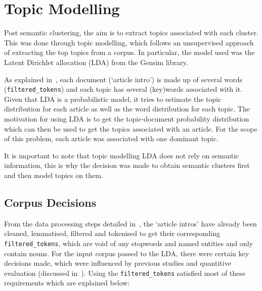 \section{Topic Modelling}

Post semantic clustering, the aim is to extract topics associated with each cluster. This was done through topic modelling, which follows an unsupervised approach of extracting the top topics from a corpus. In particular, the model used was the Latent Dirichlet allocation (LDA) from the Gensim library. 

As explained in~, each document (`article intro') is made up of several words (\texttt{filtered\_tokens}) and each topic has several (key)words associated with it. Given that LDA is a probabilistic model, it tries to estimate the topic distribution for each article as well as the word distribution for each topic. The motivation for using LDA is to get the topic-document probability distribution which can then be used to get the topics associated with an article. For the scope of this problem, each article was associated with one dominant topic. 

It is important to note that topic modelling LDA does not rely on semantic information, this is why the decision was made to obtain semantic clusters first and then model topics on them.
\vspace{-1ex}
\subsection{Corpus Decisions}

From the data processing steps detailed in~, the `article intros' have already been cleaned, lemmatised, filtered and tokenised to get their corresponding \texttt{filtered\_tokens}, which are void of any stopwords and named entities and only contain nouns. For the input corpus passed to the LDA, there were certain key decisions made, which were influenced by previous studies and quantitive evaluation (discussed in~). Using the \texttt{filtered\_tokens} satisfied most of these requirements which are explained below: 


